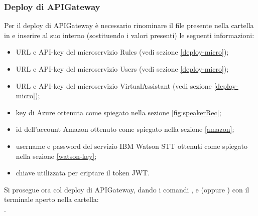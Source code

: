 \subsubsection{Deploy di APIGateway}
Per il deploy di APIGateway è necessario rinominare il file  presente nella cartella  in  e inserire al suo interno (sostituendo i valori presenti) le seguenti informazioni:
\begin{itemize}
	\item URL e API-key del microservizio Rules (vedi sezione \ref{deploy-micro});
	\item URL e API-key del microservizio Users (vedi sezione \ref{deploy-micro});
	\item URL e API-key del microservizio VirtualAssistant (vedi sezione \ref{deploy-micro});
	\item key di Azure ottenuta come spiegato nella sezione \ref{fig:speakerRec};
	\item id dell'account Amazon ottenuto come spiegato nella sezione \ref{amazon};
	\item username e password del servizio IBM Watson STT ottenuti come spiegato nella sezione \ref{watson-key};
	\item chiave utilizzata per criptare il token JWT.
\end{itemize}
Si prosegue ora col deploy di APIGateway, dando i comandi  ,  e  (oppure ) con il terminale aperto nella cartella: \\ .
\newpage
